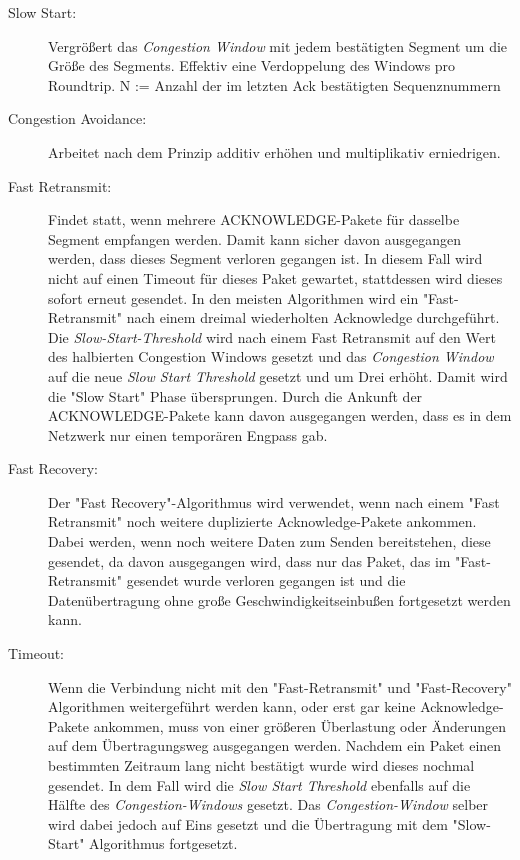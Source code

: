 \begin{description}
\item[Slow Start: ] Vergrößert das \textit{Congestion Window} mit jedem bestätigten Segment um die Größe des Segments. Effektiv eine Verdoppelung des Windows pro Roundtrip.
N := Anzahl der im letzten Ack bestätigten Sequenznummern
\item[Congestion Avoidance:] Arbeitet nach dem Prinzip additiv erhöhen und multiplikativ erniedrigen. 
\item[Fast Retransmit:] Findet statt, wenn mehrere ACKNOWLEDGE-Pakete für dasselbe Segment empfangen werden. Damit kann sicher davon ausgegangen werden, dass dieses Segment verloren gegangen ist. In diesem Fall wird nicht auf einen Timeout für dieses Paket gewartet, stattdessen wird dieses sofort erneut gesendet. In den meisten Algorithmen wird ein "{}Fast-Retransmit"{} nach einem dreimal wiederholten Acknowledge durchgeführt. Die \textit{Slow-Start-Threshold} wird nach einem Fast Retransmit auf den Wert des halbierten Congestion Windows gesetzt und das \textit{Congestion Window} auf die neue \textit{Slow Start Threshold} gesetzt und um Drei erhöht. Damit wird die "{}Slow Start"{} Phase übersprungen. Durch die Ankunft der ACKNOWLEDGE-Pakete kann davon ausgegangen werden, dass es in dem Netzwerk nur einen temporären Engpass gab. 
\item[Fast Recovery:] Der "{}Fast Recovery"{}-Algorithmus wird verwendet, wenn nach einem {}"Fast Retransmit"{} noch weitere duplizierte Acknowledge-Pakete ankommen. Dabei werden, wenn noch weitere Daten zum Senden bereitstehen, diese gesendet, da davon ausgegangen wird, dass nur das Paket, das im "{}Fast-Retransmit"{} gesendet wurde verloren gegangen ist und die Datenübertragung ohne große Geschwindigkeitseinbußen fortgesetzt werden kann. 

\item[Timeout:] Wenn die Verbindung nicht mit den "{}Fast-Retransmit"{} und {}"Fast-Recovery"{} Algorithmen weitergeführt werden kann, oder erst gar keine Acknowledge-Pakete ankommen, muss von einer größeren Überlastung oder Änderungen auf dem Übertragungsweg ausgegangen werden. Nachdem ein Paket einen bestimmten Zeitraum lang nicht bestätigt wurde wird dieses nochmal gesendet. In dem Fall wird die \textit{Slow Start Threshold} ebenfalls auf die Hälfte des \textit{Congestion-Windows} gesetzt. Das \textit{Congestion-Window} selber wird dabei jedoch auf Eins gesetzt und die Übertragung mit dem "{}Slow-Start{}" Algorithmus fortgesetzt.\cite{cc} 
\end{description}

